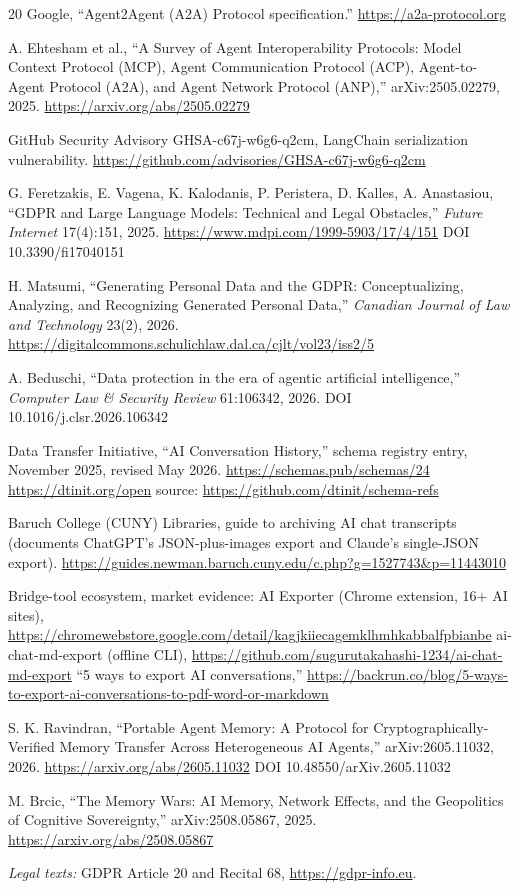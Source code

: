 \documentclass[11pt]{article}
\begin{document}
\begin{thebibliography}{20}
 Google, ``Agent2Agent (A2A) Protocol specification.'' \url{https://a2a-protocol.org}

 A. Ehtesham et al., ``A Survey of Agent Interoperability Protocols: Model Context Protocol (MCP), Agent Communication Protocol (ACP), Agent-to-Agent Protocol (A2A), and Agent Network Protocol (ANP),'' arXiv:2505.02279, 2025. \url{https://arxiv.org/abs/2505.02279}

 GitHub Security Advisory GHSA-c67j-w6g6-q2cm, LangChain serialization vulnerability. \url{https://github.com/advisories/GHSA-c67j-w6g6-q2cm}

 G. Feretzakis, E. Vagena, K. Kalodanis, P. Peristera, D. Kalles, A. Anastasiou, ``GDPR and Large Language Models: Technical and Legal Obstacles,'' \emph{Future Internet} 17(4):151, 2025. \url{https://www.mdpi.com/1999-5903/17/4/151} \textperiodcentered{} DOI 10.3390/fi17040151

 H. Matsumi, ``Generating Personal Data and the GDPR: Conceptualizing, Analyzing, and Recognizing Generated Personal Data,'' \emph{Canadian Journal of Law and Technology} 23(2), 2026. \url{https://digitalcommons.schulichlaw.dal.ca/cjlt/vol23/iss2/5}

 A. Beduschi, ``Data protection in the era of agentic artificial intelligence,'' \emph{Computer Law \& Security Review} 61:106342, 2026. DOI 10.1016/j.clsr.2026.106342

 Data Transfer Initiative, ``AI Conversation History,'' schema registry entry, November 2025, revised May 2026. \url{https://schemas.pub/schemas/24} \textperiodcentered{} \url{https://dtinit.org/open} \textperiodcentered{} source: \url{https://github.com/dtinit/schema-refs}

 Baruch College (CUNY) Libraries, guide to archiving AI chat transcripts (documents ChatGPT's JSON-plus-images export and Claude's single-JSON export). \url{https://guides.newman.baruch.cuny.edu/c.php?g=1527743&p=11443010}

 Bridge-tool ecosystem, market evidence: AI Exporter (Chrome extension, 16+ AI sites), \url{https://chromewebstore.google.com/detail/kagjkiiecagemklhmhkabbalfpbianbe} \textperiodcentered{} ai-chat-md-export (offline CLI), \url{https://github.com/sugurutakahashi-1234/ai-chat-md-export} \textperiodcentered{} ``5 ways to export AI conversations,'' \url{https://backrun.co/blog/5-ways-to-export-ai-conversations-to-pdf-word-or-markdown}

 S. K. Ravindran, ``Portable Agent Memory: A Protocol for Cryptographically-Verified Memory Transfer Across Heterogeneous AI Agents,'' arXiv:2605.11032, 2026. \url{https://arxiv.org/abs/2605.11032} \textperiodcentered{} DOI 10.48550/arXiv.2605.11032

 M. Brcic, ``The Memory Wars: AI Memory, Network Effects, and the Geopolitics of Cognitive Sovereignty,'' arXiv:2508.05867, 2025. \url{https://arxiv.org/abs/2508.05867}

\noindent\emph{Legal texts:} GDPR Article 20 and Recital 68, \url{https://gdpr-info.eu}.

\end{thebibliography}
\end{document}
